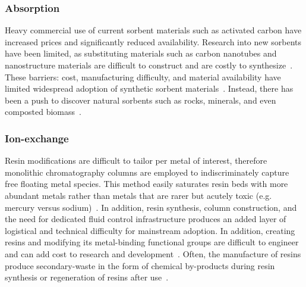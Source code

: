 \documentclass[../main/main]{subfiles}
\begin{document}
\subsubsection*{Absorption}
Heavy commercial use of current sorbent materials such as activated carbon have increased prices and significantly reduced availability. Research into new sorbents have been limited, as substituting materials such as carbon nanotubes and nanostructure materials are difficult to construct and are costly to synthesize~\cite{stafiej2007adsorption}. These barriers: cost, manufacturing difficulty, and material availability have limited widespread adoption of synthetic sorbent materials~\cite{fu2011}. Instead, there has been a push to discover natural sorbents such as rocks, minerals, and even composted biomass~\cite{razmovski2008biosorption}.

\subsubsection*{Ion-exchange}
Resin modifications are difficult to tailor per metal of interest, therefore monolithic chromatography columns are employed to indiscriminately capture free floating metal species. This method easily saturates resin beds with more abundant metals rather than metals that are rarer but acutely toxic (e.g. mercury versus sodium)~\cite{ustun2007regeneration}.
In addition, resin synthesis, column construction, and the need for dedicated fluid control infrastructure produces an added layer of logistical and technical difficulty for mainstream adoption. In addition, creating resins and modifying its metal-binding functional groups are difficult to engineer and can add cost to research and development~\cite{wachinski2016}. Often, the manufacture of resins produce secondary-waste in the form of chemical by-products during resin synthesis or regeneration of resins after use~\cite{amini2015}.

\end{document}
